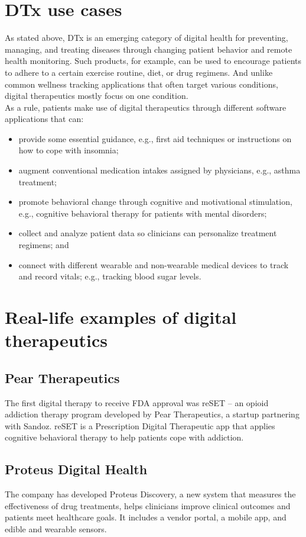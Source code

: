 \documentclass[15pt]{article}
\begin{document}
\section{DTx use cases}
As stated above, DTx is an emerging category of digital health for preventing, managing, and treating diseases through changing patient behavior and remote health monitoring. Such products, for example, can be used to encourage patients to adhere to a certain exercise routine, diet, or drug regimens. And unlike common wellness tracking applications that often target various conditions, digital therapeutics mostly focus on one condition.\\

As a rule, patients make use of digital therapeutics through different software applications that can:

\begin{itemize}
\item provide some essential guidance, e.g., first aid techniques or instructions on how to cope with insomnia;
\item augment conventional medication intakes assigned by physicians, e.g., asthma treatment;
\item promote behavioral change through cognitive and motivational stimulation, e.g., cognitive behavioral therapy for patients with mental disorders;
\item collect and analyze patient data so clinicians can personalize treatment regimens; and
\item connect with different wearable and non-wearable medical devices to track and record vitals; e.g., tracking blood sugar levels.
\end{itemize}

\section{ Real-life examples of digital therapeutics}
\subsection{Pear Therapeutics}
The first digital therapy to receive FDA approval was reSET – an opioid addiction therapy program developed by Pear Therapeutics, a startup partnering with Sandoz. reSET is a Prescription Digital Therapeutic app that applies cognitive behavioral therapy to help patients cope with addiction.
\subsection{Proteus Digital Health}
The company has developed Proteus Discovery, a new system that measures the effectiveness of drug treatments, helps clinicians improve clinical outcomes and patients meet healthcare goals. It includes a vendor portal, a mobile app, and edible and wearable sensors.
\end{document}
